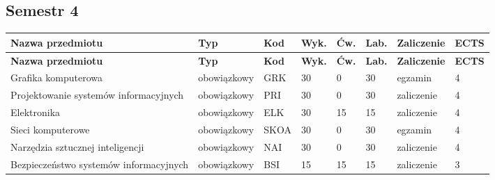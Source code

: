 \documentclass[12pt,a4paper]{article}
\newcommand{\thdrule}{\noalign{\global\setlength{\extrarowheight}{0pt}}}
\newcommand{\thdend}{\noalign{\global\setlength{\extrarowheight}{4pt}}}
\begin{document}
\subsection*{Semestr 4}

{\scriptsize
\begin{longtable}{m{5.0cm}m{1.9cm}m{0.75cm}m{0.85cm}m{0.85cm}m{0.85cm}m{1.45cm}m{0.9cm}}
\thdrule\toprule
\rowcolor{pjatkRed}
{\color{white}\footnotesize\textbf{\vphantom{Ag}Nazwa przedmiotu}} & {\color{white}\footnotesize\textbf{\vphantom{Ag}Typ}} & {\color{white}\footnotesize\textbf{\vphantom{Ag}Kod}} & {\color{white}\footnotesize\textbf{\vphantom{Ag}Wyk.}} & {\color{white}\footnotesize\textbf{\vphantom{Ag}Ćw.}} & {\color{white}\footnotesize\textbf{\vphantom{Ag}Lab.}} & {\color{white}\footnotesize\textbf{\vphantom{Ag}Zaliczenie}} & {\color{white}\footnotesize\textbf{\vphantom{Ag}ECTS}} \\
\midrule\thdend
\endfirsthead
\thdrule\toprule
\rowcolor{pjatkRed}
{\color{white}\footnotesize\textbf{\vphantom{Ag}Nazwa przedmiotu}} & {\color{white}\footnotesize\textbf{\vphantom{Ag}Typ}} & {\color{white}\footnotesize\textbf{\vphantom{Ag}Kod}} & {\color{white}\footnotesize\textbf{\vphantom{Ag}Wyk.}} & {\color{white}\footnotesize\textbf{\vphantom{Ag}Ćw.}} & {\color{white}\footnotesize\textbf{\vphantom{Ag}Lab.}} & {\color{white}\footnotesize\textbf{\vphantom{Ag}Zaliczenie}} & {\color{white}\footnotesize\textbf{\vphantom{Ag}ECTS}} \\
\midrule\thdend
\endhead
\rowcolor{tableRowLight} Grafika komputerowa & {\scriptsize obowiązkowy} & GRK & 30 & 0 & 30 & {\scriptsize egzamin} & 4 \\
\rowcolor{tableRowAlt} Projektowanie systemów informacyjnych & {\scriptsize obowiązkowy} & PRI & 30 & 0 & 30 & {\scriptsize zaliczenie} & 4 \\
\rowcolor{tableRowLight} Elektronika & {\scriptsize obowiązkowy} & ELK & 30 & 15 & 15 & {\scriptsize zaliczenie} & 4 \\
\rowcolor{tableRowAlt} Sieci komputerowe & {\scriptsize obowiązkowy} & SKOA & 30 & 0 & 30 & {\scriptsize egzamin} & 4 \\
\rowcolor{tableRowLight} Narzędzia sztucznej inteligencji & {\scriptsize obowiązkowy} & NAI & 30 & 0 & 30 & {\scriptsize zaliczenie} & 4 \\
\rowcolor{tableRowAlt} Bezpieczeństwo systemów informacyjnych & {\scriptsize obowiązkowy} & BSI & 15 & 15 & 15 & {\scriptsize zaliczenie} & 3 \\

\end{longtable}}
\end{document}
